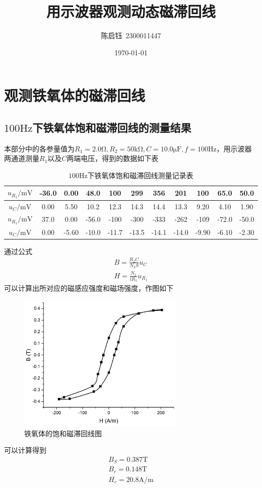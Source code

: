 \documentclass{ctexart}
\title{用示波器观测动态磁滞回线}
\author{陈启钰\,\,\,2300011447}
\date{\today}
\begin{document}
	\maketitle
	\tableofcontents
	\section{观测铁氧体的磁滞回线}
	\subsection{$100\mathrm{Hz}$下铁氧体饱和磁滞回线的测量结果}
	本部分中的各参量值为$R_1=2.0\mathrm{\Omega},R_2=50\mathrm{k\Omega},C=10.0\mathrm{\mu F},f=100\mathrm{Hz}$，用示波器两通道测量$R_1$以及$C$两端电压，得到的数据如下表
	\begin{table}[H]
		\begin{center}
			\caption{$100\mathrm{Hz}$下铁氧体饱和磁滞回线测量记录表}
			\begin{tabular}{c|cccccccccc}
				$u_{R_1}/\mathrm{mV}$&-36.0&0.00&48.0&100&299&356&201&100&65.0&50.0\\
				\hline
				$u_{C}/\mathrm{mV}$ &0.00 &5.50 &10.2 &12.3 &14.3 &14.4 &13.3 &9.20 &4.10 & 1.90\\
				\hline
				$u_{R_1}/\mathrm{mV}$ &37.0&0.00 &-56.0 &-100 &-300 &-333 &-262 &-109 &-72.0 &-50.0 \\
				\hline
				$u_{C}/\mathrm{mV}$ &0.00 &-5.60 &-10.0 &-11.7 &-13.5 &-14.1 &-14.0 &-9.90 &-6.10 &-2.30 \\
			\end{tabular}
		\end{center}
	\end{table}
	通过公式
	\begin{align}
		B=\frac{R_2C}{N_2S}u_C\\
		H=\frac{N_1}{lR_1}u_{R_1}
	\end{align}
	可以计算出所对应的磁感应强度和磁场强度，作图如下
	\begin{figure}[H]
		\centering
		\includegraphics[width=8cm]{1.png}
		\caption{铁氧体的饱和磁滞回线图}
	\end{figure}
	可以计算得到
	\begin{align}
		B_S=0.387\mathrm{T}\\
		B_r=0.148\mathrm{T}\\
		H_c=20.8\mathrm{A/m}
	\end{align}
\end{document}
